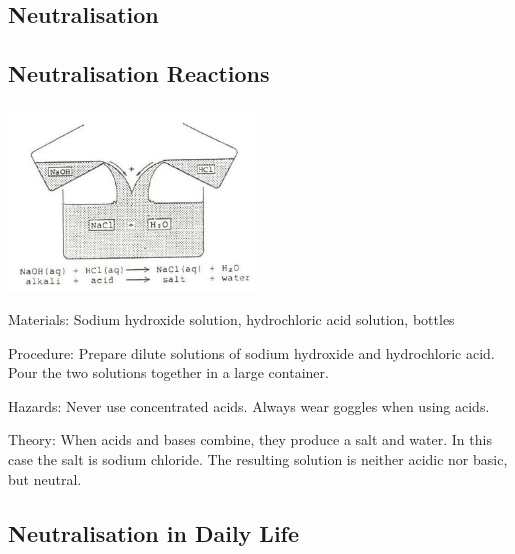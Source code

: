 \begin{multicols}{2}

\section*{Neutralisation}


\subsection{Neutralisation Reactions}

\begin{center}
\includegraphics[width=0.49\textwidth]{./img/source/neutralisation.jpg}
\end{center}

\begin{description*}
\item[Materials:]{Sodium hydroxide solution, hydrochloric acid solution, bottles}
\item[Procedure:]{Prepare dilute solutions of sodium hydroxide and hydrochloric acid. Pour the two solutions together in a large container.}
\item[Hazards:]{Never use concentrated acids. Always wear goggles when using acids.}
\item[Theory:]{When acids and bases combine, they produce a salt and water. In this case the salt is sodium chloride. The resulting solution is neither acidic nor basic, but neutral.}
\end{description*}

\subsection{Neutralisation in Daily Life}


\end{multicols}

